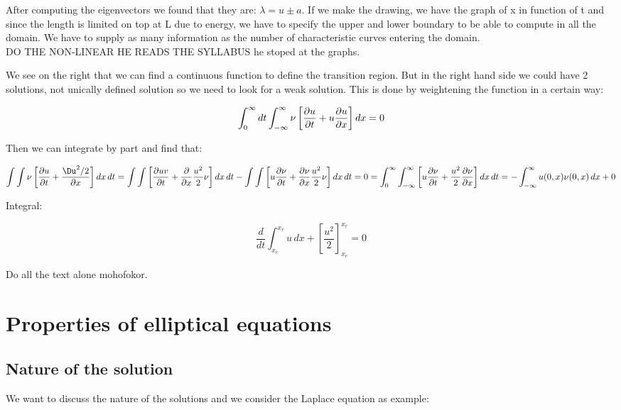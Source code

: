 After computing the eigenvectors we found that they are: $\lambda = u\pm a$. If we make the drawing, we have the graph of x in function of t and since the length is limited on top at L due to energy, we have to specify the upper and lower boundary to be able to compute in all the domain. We have to supply as many information as the number of characteristic curves entering the domain. \\

DO THE NON-LINEAR HE READS THE SYLLABUS he stoped at the graphs. 

We see on the right that we can find a continuous function to define the transition region. But in the right hand side we could have 2 solutions, not unically defined solution so we need to look for a weak solution. This is done by weightening the function in a certain way: 

\begin{equation}
\int _0 ^\infty dt \int _{-\infty}^\infty \nu \left[\frac{\partial u}{\partial t} + u \frac{\partial u }{\partial x}\right] dx = 0 
\end{equation}

Then we can integrate by part and find that: 

\begin{equation}
\int \int \nu \left[ \frac{\D u}{\D t} +\frac{\Du^2/2}{\D x}\right] dx\, dt = \int \int \left[ \frac{\D uv}{\D t} + \frac{\D}{\D x} \frac{u^2}{2} \nu  \right]dx\, dt - \int \int \left[ u\frac{\D \nu}{\D t} + \frac{\D \nu}{\D x} \frac{u^2}{2} \nu  \right]dx\, dt  =0 =\int _0^\infty  \int _{-\infty}^\infty \left[u \frac{\D \nu}{\D t} + \frac{u^2}{2}\frac{\D \nu }{\D x}\right] dx\, dt = -\int _{-\infty}^\infty u(0,x)\nu (0,x) \, dx +0
\end{equation}

Integral: 

\begin{equation}
\frac{d}{dt} \int _{x_e}^{x_r} u \, dx + \left[ \frac{u^2}{2}\right]_{x_e}^{x_r} = 0 
\end{equation}

Do all the text alone mohofokor. 

\section{Properties of elliptical equations}
\subsection{Nature of the solution}
We want to discuss the nature of the solutions and we consider the Laplace equation as example: 

